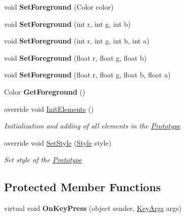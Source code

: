 \begin{DoxyCompactItemize}
\item 
\mbox{\label{class_space_v_i_l_1_1_menu_bar_aa0c13847c64b4ba1e843a3302a14fe89}} 
void {\bfseries Set\+Foreground} (Color color)
\item 
\mbox{\label{class_space_v_i_l_1_1_menu_bar_a51d3435a7f9dc7b9e4424f1f6abe8356}} 
void {\bfseries Set\+Foreground} (int r, int g, int b)
\item 
\mbox{\label{class_space_v_i_l_1_1_menu_bar_a1044ec612913ff641be8e3db80817867}} 
void {\bfseries Set\+Foreground} (int r, int g, int b, int a)
\item 
\mbox{\label{class_space_v_i_l_1_1_menu_bar_a9ce72625e0315f5245fa88fc7e4fa1d2}} 
void {\bfseries Set\+Foreground} (float r, float g, float b)
\item 
\mbox{\label{class_space_v_i_l_1_1_menu_bar_ae55814480cb777d60a8887d57075e232}} 
void {\bfseries Set\+Foreground} (float r, float g, float b, float a)
\item 
\mbox{\label{class_space_v_i_l_1_1_menu_bar_a7639bc4ed96338c83d738102cde005ac}} 
Color {\bfseries Get\+Foreground} ()
\item 
override void \mbox{\hyperlink{class_space_v_i_l_1_1_menu_bar_a9873e7466eac5668ecc9df715b35ce08}{Init\+Elements}} ()
\begin{DoxyCompactList}\small\item\em Initialization and adding of all elements in the \mbox{\hyperlink{class_space_v_i_l_1_1_prototype}{Prototype}} \end{DoxyCompactList}\item 
override void \mbox{\hyperlink{class_space_v_i_l_1_1_menu_bar_a999e99bd760bb19092d309dff262ea5e}{Set\+Style}} (\mbox{\hyperlink{class_space_v_i_l_1_1_decorations_1_1_style}{Style}} style)
\begin{DoxyCompactList}\small\item\em Set style of the \mbox{\hyperlink{class_space_v_i_l_1_1_prototype}{Prototype}} \end{DoxyCompactList}\end{DoxyCompactItemize}
\subsection*{Protected Member Functions}
\begin{DoxyCompactItemize}
\item 
\mbox{\label{class_space_v_i_l_1_1_menu_bar_a80b6a0fc082de003779e79a35763abd0}} 
virtual void {\bfseries On\+Key\+Press} (object sender, \mbox{\hyperlink{class_space_v_i_l_1_1_core_1_1_key_args}{Key\+Args}} args)
\end{DoxyCompactItemize}
